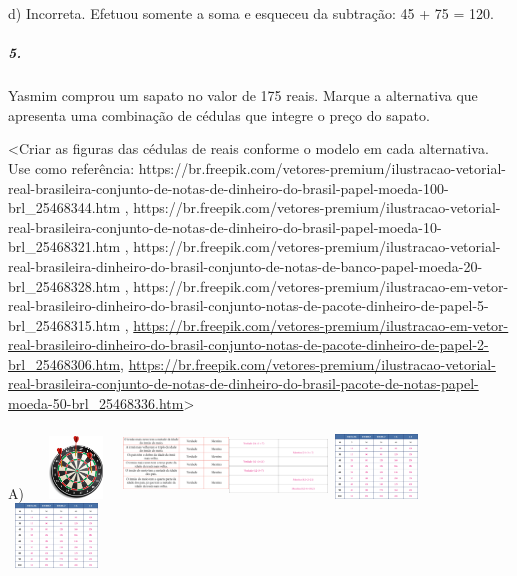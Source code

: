 d) Incorreta. Efetuou somente a soma e esqueceu da subtração: 45 + 75 =
120.

\subparagraph{5. }\label{section-104}

Yasmim comprou um sapato no valor de 175 reais. Marque a alternativa que
apresenta uma combinação de cédulas que integre o preço do sapato.

\textless{}Criar as figuras das cédulas de reais conforme o modelo em
cada alternativa. Use como referência:
https://br.freepik.com/vetores-premium/ilustracao-vetorial-real-brasileira-conjunto-de-notas-de-dinheiro-do-brasil-papel-moeda-100-brl\_25468344.htm
,
https://br.freepik.com/vetores-premium/ilustracao-vetorial-real-brasileira-conjunto-de-notas-de-dinheiro-do-brasil-papel-moeda-10-brl\_25468321.htm
,
https://br.freepik.com/vetores-premium/ilustracao-vetorial-real-brasileira-dinheiro-do-brasil-conjunto-de-notas-de-banco-papel-moeda-20-brl\_25468328.htm
,
https://br.freepik.com/vetores-premium/ilustracao-em-vetor-real-brasileiro-dinheiro-do-brasil-conjunto-notas-de-pacote-dinheiro-de-papel-5-brl\_25468315.htm
,
\url{https://br.freepik.com/vetores-premium/ilustracao-em-vetor-real-brasileiro-dinheiro-do-brasil-conjunto-notas-de-pacote-dinheiro-de-papel-2-brl_25468306.htm},
\url{https://br.freepik.com/vetores-premium/ilustracao-vetorial-real-brasileira-conjunto-de-notas-de-dinheiro-do-brasil-pacote-de-notas-papel-moeda-50-brl_25468336.htm}\textgreater{}

A)
\includegraphics[width=0.98131in,height=0.65625in]{media/image108.png}\includegraphics[width=1.10972in,height=0.74212in]{media/image109.png}\includegraphics[width=1.02736in,height=0.68704in]{media/image110.png}\includegraphics[width=1.01042in,height=0.67572in]{media/image111.png}\includegraphics[width=1.01042in,height=0.67572in]{media/image111.png}

